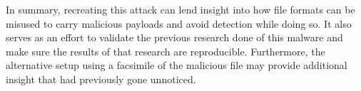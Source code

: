 In summary, recreating this attack can lend insight into how file formats can be misused to carry malicious payloads and
avoid detection while doing so. It also serves as an effort to validate the previous research done of this malware and
make sure the results of that research are reproducible. Furthermore, the alternative setup using a facsimile of the
malicious file may provide additional insight that had previously gone unnoticed.

